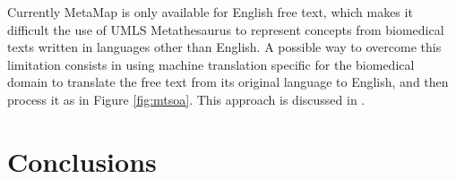 \documentclass[11pt]{article}
\begin{document}
Currently MetaMap is only available for English free text, which makes it difficult the use of UMLS Metathesaurus to represent concepts from biomedical texts written in languages other than English. A possible way to overcome this limitation consists in using machine translation specific for the biomedical domain to translate the free text from its original language to English, and then process it as in Figure \ref{fig:mtsoa}. This approach is discussed in .

%
%
%
%
%




\section{Conclusions}
\end{document}
